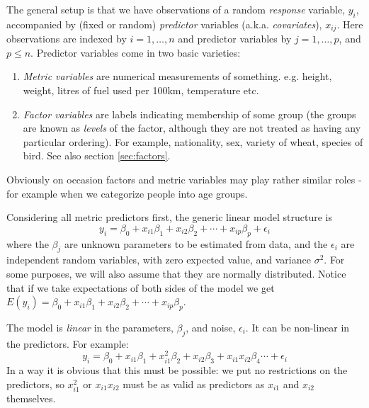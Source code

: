 \documentclass[10pt] {article}
\theoremstyle{definition}
\begin{document}
The general setup is that we have observations of a random {\em response} variable, $y_i$, accompanied by (fixed or random) {\em predictor} variables (a.k.a. {\em covariates}), $x_{ij}$. Here observations are indexed by $i = 1,\ldots,n $ and predictor variables by $j=1, \ldots, p$, and $p \le n$. Predictor variables come in two basic varieties:
\begin{enumerate}
\item {\em Metric variables} are numerical measurements of something. e.g. height, weight, litres of fuel used per 100km, temperature etc. 
\item {\em Factor variables} are labels indicating membership of some group (the groups are known as {\em levels} of the factor, although they are not treated as having any particular ordering). For example, nationality, sex, variety of wheat, species of bird. See also section \ref{sec:factors}.  
\end{enumerate}  
Obviously on occasion factors and metric variables may play rather similar roles - for example when we categorize people into age groups.

Considering all metric predictors first, the generic linear model structure is 
$$
y_i = \beta_0 + x_{i1} \beta_1 + x_{i2} \beta_2 + \cdots + x_{ip} \beta_p + \epsilon_i 
$$
where the $\beta_j$ are unknown parameters to be estimated from data, and the $\epsilon_i$ are independent random variables, with zero expected value, and variance $\sigma^2$. For some purposes, we will also assume that they are normally distributed. Notice that if we take expectations of both sides of the model we get $E(y_i) =  \beta_0 + x_{i1} \beta_1 + x_{i2} \beta_2 + \cdots + x_{ip}\beta_p $. 

The model is {\em linear} in the parameters, $\beta_j$, and noise, $\epsilon_i$. It can be non-linear in the predictors. For example:
$$
y_i = \beta_0 + x_{i1} \beta_1 + x_{i1}^2 \beta_2 + x_{i2} \beta_3 + x_{i1} x_{i2} \beta_4 \cdots + \epsilon_i 
$$
In a way it is obvious that this must be possible: we put no restrictions on the predictors, so $x_{i1}^2$ or $x_{i1} x_{i2}$ must be as valid as predictors as $x_{i1}$ and $x_{i2}$ themselves.  
\end{document}
